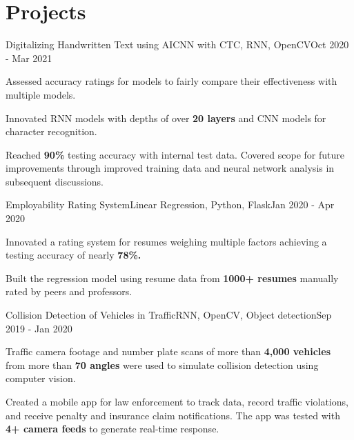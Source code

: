 \documentclass[letterpaper]{resume_config}
\begin{document}
\section{Projects}
\Project
    {Digitalizing Handwritten Text using AI}{CNN with CTC, RNN, OpenCV}{Oct 2020 - Mar 2021}
    {
        \item {Assessed accuracy ratings for models to fairly compare their effectiveness with multiple models.} 
        \item {Innovated RNN models with depths of over \textbf{20 layers} and CNN models for character recognition.}
        \item {Reached \textbf{90\%} testing accuracy with internal test data. Covered scope for future improvements through improved training data and neural network analysis in subsequent discussions.}
    }
\Project
    {Employability Rating System}{Linear Regression, Python, Flask}{Jan 2020 - Apr 2020}
    {
        \item {Innovated a rating system for resumes weighing multiple factors achieving a testing accuracy of nearly \textbf{78\%.}}
        \item {Built the regression model using resume data from \textbf{1000+ resumes} manually rated by peers and professors.}
    }
\Project
    {Collision Detection of Vehicles in Traffic}{RNN, OpenCV, Object detection}{Sep 2019 - Jan 2020}
    {
        \item {Traffic camera footage and number plate scans of more than \textbf{4,000 vehicles} from more than \textbf{70 angles} were used to simulate collision detection using computer vision.}
        \item {Created a mobile app for law enforcement to track data, record traffic violations, and receive penalty and insurance claim notifications. The app was tested with \textbf{4+ camera feeds} to generate real-time response.}
    }
\vspace{-10pt}

\end{document}
